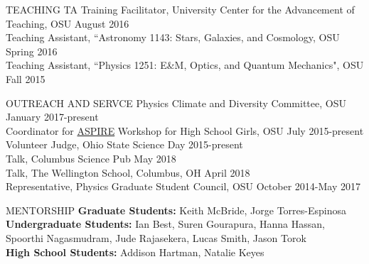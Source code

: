 \documentclass{resume} %
\begin{document}
\begin{rSection}{TEACHING}
TA Training Facilitator, University Center for the Advancement of Teaching, OSU \hfill {August 2016}\\
Teaching Assistant, ``Astronomy 1143: Stars, Galaxies, and Cosmology, OSU \hfill {Spring 2016}\\
Teaching Assistant, ``Physics 1251: E\&M, Optics, and Quantum Mechanics", OSU \hfill {Fall 2015}\\
\end{rSection}
\vspace{-0.35cm}
\begin{rSection}{OUTREACH AND SERVCE}
Physics Climate and Diversity Committee, OSU \hfill January 2017-present\\
Coordinator for \href{u.osu.edu/aspire}{ASPIRE} Workshop for High School Girls, OSU \hfill July 2015-present\\
Volunteer Judge, Ohio State Science Day \hfill 2015-present\\
Talk, Columbus Science Pub \hfill  May 2018\\
Talk, The Wellington School, Columbus, OH \hfill April 2018\\
Representative, Physics Graduate Student Council, OSU \hfill October 2014-May 2017 \\
\end{rSection}
\vspace{-0.30cm}

\newpage
\begin{rSection}{MENTORSHIP}
{\bf Graduate Students:} Keith McBride, Jorge Torres-Espinosa\\
{\bf Undergraduate Students:}  Ian Best, Suren Gourapura, Hanna Hassan, Spoorthi Nagasmudram, Jude Rajasekera, Lucas Smith, Jason Torok \\
{\bf High School Students:} Addison Hartman, Natalie Keyes\\
\end{rSection}
\end{document}
